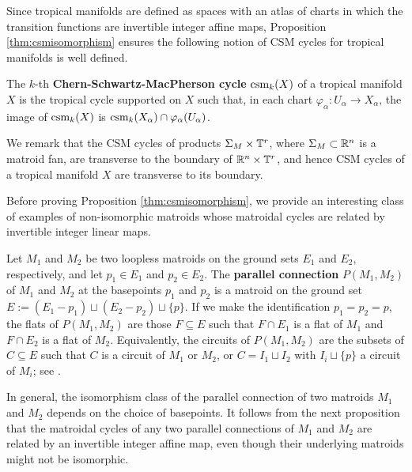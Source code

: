 Since tropical manifolds are defined as spaces with an atlas of charts in which the transition functions are invertible integer affine maps, Proposition \ref{thm:csmisomorphism} ensures the following notion of CSM cycles for tropical manifolds is well defined.

\begin{defi}\label{def:csmManifold}
The $k$-th \textbf{Chern-Schwartz-MacPherson cycle} $\operatorname{csm}_k(X)$ of a tropical manifold $X$ is the tropical cycle supported on $X$ such that, in each chart $\varphi_{\alpha} \colon U_{\alpha} \to X_{\alpha}$, the image of $\operatorname{csm}_k(X)$ is $\operatorname{csm}_k(X_{\alpha}) \cap \varphi_{\alpha} (U_{\alpha})$. 
\end{defi}

\begin{rem}
We remark that the CSM cycles of products $\Sigma_M \times \mathbb{T}^{r}$, where $\Sigma_{M} \subset \mathbb{R}^n$ is a matroid fan, are transverse to the boundary of $\mathbb{R}^{n} \times \mathbb{T}^{r}$, and hence CSM cycles of a tropical manifold $X$ are transverse to its boundary. 
\end{rem}

Before proving Proposition \ref{thm:csmisomorphism}, we provide an interesting class of examples of non-isomorphic matroids whose matroidal cycles are related by invertible integer linear maps.

\begin{defi}\label{defi:parallel}
Let $M_1$ and $M_2$ be two loopless matroids on the ground sets $E_1$ and $E_2$, respectively, and let $p_1 \in E_1$ and $p_2 \in E_2$. The {\bf parallel connection} $P(M_1,M_2)$ of $M_1$ and $M_2$ at the basepoints $p_1$ and $p_2$ is a matroid on the ground set $E := (E_1 - p_1) \sqcup (E_2 - p_2) \sqcup \{p\}$. If we make the identification $p_1 = p_2 = p$, the flats of $P(M_1,M_2)$ are those $F \subseteq E$ such that $F \cap E_1$ is a flat of $M_1$ and $F \cap E_2$ is a flat of $M_2$. Equivalently, the circuits of $P(M_1,M_2)$ are the subsets of $C \subseteq E$ such that $C$ is a circuit of $M_1$ or $M_2$, or $C = I_1 \sqcup I_2$ with $I_i \sqcup \{p\}$ a circuit of $M_i$; see \cite[Proposition 7.6.6]{White1}.
\end{defi}

In general, the isomorphism class of the parallel connection of two matroids $M_1$ and $M_2$ depends on the choice of basepoints. It follows from the next proposition that the matroidal cycles of any two parallel connections of $M_1$ and $M_2$ are related by an invertible integer affine map, even though their underlying matroids might not be isomorphic. 


